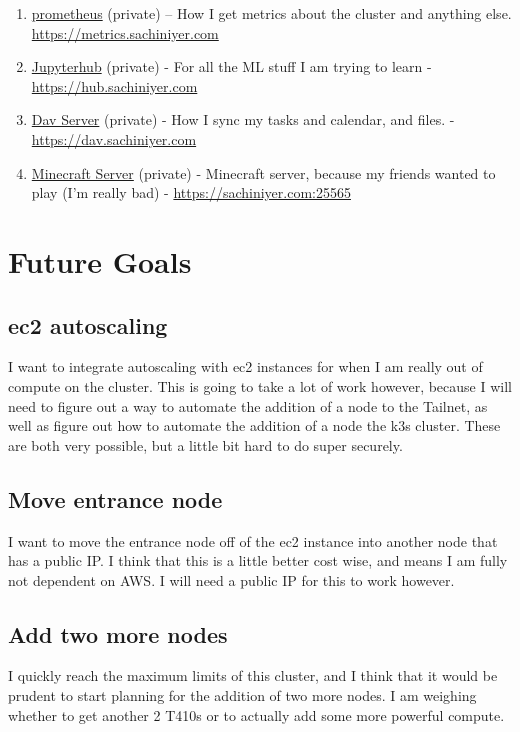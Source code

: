 \documentclass[12pt]{article}
\begin{document}
\begin{enumerate}
  \item \href{https://prometheus.io/}{prometheus} (private) -- How I get metrics about the cluster and anything else. \href{https://metrics.sachiniyer.com}{https://metrics.sachiniyer.com}
  \item \href{https://jupyterhub.readthedocs.io/en/stable/installation-guide.html}{Jupyterhub} (private) - For all the ML stuff I am trying to learn - \href{https://hub.sachiniyer.com}{https://hub.sachiniyer.com}
  \item \href{https://sabre.io/baikal/}{Dav Server} (private) - How I sync my tasks and calendar, and files. - \href{https://dav.sachiniyer.com}{https://dav.sachiniyer.com}
  \item \href{https://sabre.io/baikal/}{Minecraft Server} (private) - Minecraft server, because my friends wanted to play (I'm really bad) - \href{https://sachiniyer.com:25565}{https://sachiniyer.com:25565}
\end{enumerate}

\section{Future Goals}
\subsection{ec2 autoscaling}
I want to integrate autoscaling with ec2 instances for when I am really out of compute on the cluster. This is going to take a lot of work however, because I will need to figure out a way to automate the addition of a node to the Tailnet, as well as figure out how to automate the addition of a node the k3s cluster. These are both very possible, but a little bit hard to do super securely.

\subsection{Move entrance node}
I want to move the entrance node off of the ec2 instance into another node that has a public IP. I think that this is a little better cost wise, and means I am fully not dependent on AWS. I will need a public IP for this to work however.

\subsection{Add two more nodes}
I quickly reach the maximum limits of this cluster, and I think that it would be prudent to start planning for the addition of two more nodes. I am weighing whether to get another 2 T410s or to actually add some more powerful compute.
\end{document}
